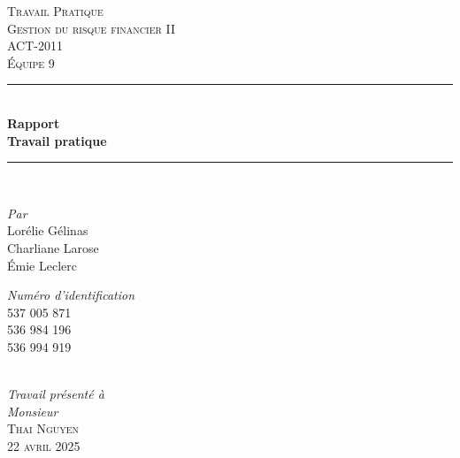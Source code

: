 \begin{titlepage}

\newcommand{\HRule}{\rule{\linewidth}{0.5mm}} %

\center %
\textsc{\LARGE Travail Pratique}\\[1.0cm]
\textsc{\Large Gestion du risque financier II}\\[0.2cm]
\textsc{\large ACT-2011}\\[0.7cm]
\textsc{\large Équipe 9}\\[0.7cm]

\HRule \\[0.4cm]
{ \Large \bfseries Rapport}\\[0.20cm] { \huge \bfseries Travail pratique}\\[0.20cm]

\HRule \\[2cm]

\begin{minipage}{0.4\textwidth}
    \begin{flushleft} \large
    \emph{Par}\\
        Lorélie Gélinas \textsc{}\\
        Charliane Larose \textsc{}\\
        Émie Leclerc \textsc{}
    \end{flushleft}
\end{minipage}%
\begin{minipage}{0.4\textwidth}
    \begin{flushright} \large
    \emph{Numéro d'identification}\\
        537 005 871\\
        536 984 196\\
        536 994 919\\
    \end{flushright}
\end{minipage} \\[1.0cm]

\emph{Travail présenté à} \\
\emph{Monsieur} \\[0.1cm]
\textsc{\Large Thai \textsc{Nguyen}}\\[1.0cm]

\textsc{\large 22 avril 2025}\\[1cm]

\vfill %

\end{titlepage}